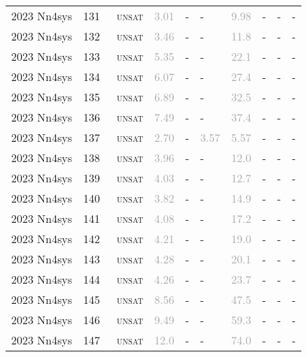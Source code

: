 \begin{center}
{\begin{longtable}{@{}llllllllll@{}}
2023 Nn4sys & 131 & ~\textsc{unsat} & \textcolor{darkgray}{3.01} & - & - & \textcolor{darkgray}{9.98} & - & - & - \\
2023 Nn4sys & 132 & ~\textsc{unsat} & \textcolor{darkgray}{3.46} & - & - & \textcolor{darkgray}{11.8} & - & - & - \\
2023 Nn4sys & 133 & ~\textsc{unsat} & \textcolor{darkgray}{5.35} & - & - & \textcolor{darkgray}{22.1} & - & - & - \\
2023 Nn4sys & 134 & ~\textsc{unsat} & \textcolor{darkgray}{6.07} & - & - & \textcolor{darkgray}{27.4} & - & - & - \\
2023 Nn4sys & 135 & ~\textsc{unsat} & \textcolor{darkgray}{6.89} & - & - & \textcolor{darkgray}{32.5} & - & - & - \\
2023 Nn4sys & 136 & ~\textsc{unsat} & \textcolor{darkgray}{7.49} & - & - & \textcolor{darkgray}{37.4} & - & - & - \\
2023 Nn4sys & 137 & ~\textsc{unsat} & \textcolor{darkgray}{2.70} & - & \textcolor{darkgray}{3.57} & \textcolor{darkgray}{5.57} & - & - & - \\
2023 Nn4sys & 138 & ~\textsc{unsat} & \textcolor{darkgray}{3.96} & - & - & \textcolor{darkgray}{12.0} & - & - & - \\
2023 Nn4sys & 139 & ~\textsc{unsat} & \textcolor{darkgray}{4.03} & - & - & \textcolor{darkgray}{12.7} & - & - & - \\
2023 Nn4sys & 140 & ~\textsc{unsat} & \textcolor{darkgray}{3.82} & - & - & \textcolor{darkgray}{14.9} & - & - & - \\
2023 Nn4sys & 141 & ~\textsc{unsat} & \textcolor{darkgray}{4.08} & - & - & \textcolor{darkgray}{17.2} & - & - & - \\
2023 Nn4sys & 142 & ~\textsc{unsat} & \textcolor{darkgray}{4.21} & - & - & \textcolor{darkgray}{19.0} & - & - & - \\
2023 Nn4sys & 143 & ~\textsc{unsat} & \textcolor{darkgray}{4.28} & - & - & \textcolor{darkgray}{20.1} & - & - & - \\
2023 Nn4sys & 144 & ~\textsc{unsat} & \textcolor{darkgray}{4.26} & - & - & \textcolor{darkgray}{23.7} & - & - & - \\
2023 Nn4sys & 145 & ~\textsc{unsat} & \textcolor{darkgray}{8.56} & - & - & \textcolor{darkgray}{47.5} & - & - & - \\
2023 Nn4sys & 146 & ~\textsc{unsat} & \textcolor{darkgray}{9.49} & - & - & \textcolor{darkgray}{59.3} & - & - & - \\
2023 Nn4sys & 147 & ~\textsc{unsat} & \textcolor{darkgray}{12.0} & - & - & \textcolor{darkgray}{74.0} & - & - & - \\

\end{longtable}}
\end{center}
